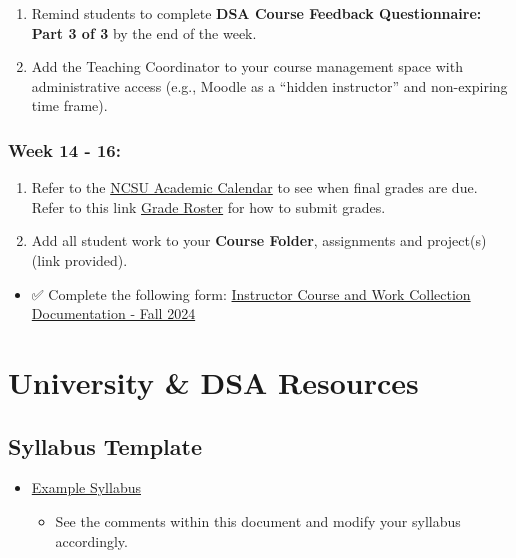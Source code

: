 \documentclass[
]{book}
\providecommand{\tightlist}{%
  \setlength{\itemsep}{0pt}\setlength{\parskip}{0pt}}
\begin{document}
\begin{enumerate}
\def\labelenumi{\arabic{enumi})}
\item
  Remind students to complete \textbf{DSA Course Feedback Questionnaire: Part 3 of 3} by the end of the week.
\item
  Add the Teaching Coordinator to your course management space with administrative access (e.g., Moodle as a ``hidden instructor'' and non-expiring time frame).
\end{enumerate}

\subsection{Week 14 - 16:}\label{week-14---16}

\begin{enumerate}
\def\labelenumi{\arabic{enumi})}
\item
  Refer to the \href{https://studentservices.ncsu.edu/calendars/academic/}{NCSU Academic Calendar} to see when final grades are due. Refer to this link \href{https://sis.emas.ncsu.edu/faculty/faculty-center/\#grades}{Grade Roster} for how to submit grades.
\item
  Add all student work to your \textbf{Course Folder}, assignments and project(s) (link provided).
\end{enumerate}

\begin{itemize}
\tightlist
\item
  ✅ Complete the following form: \href{https://docs.google.com/forms/d/e/1FAIpQLScV3CbK-M4OCDCSreFOG0X-7m--y73s5uXzyyWClMUWA0QTFA/viewform?usp=sf_link}{Instructor Course and Work Collection Documentation - Fall 2024}
\end{itemize}

\chapter{University \& DSA Resources}\label{university-dsa-resources}

\section{Syllabus Template}\label{syllabus-template}

\begin{itemize}
\tightlist
\item
  \href{https://docs.google.com/document/d/12w-byO3kEmP4ofI8GIuDAbXkEOA3hwqVGXz3qRbX-l4/edit?usp=sharing}{Example Syllabus}

  \begin{itemize}
  \tightlist
  \item
    See the comments within this document and modify your syllabus accordingly.
  \end{itemize}
\end{itemize}
\end{document}
